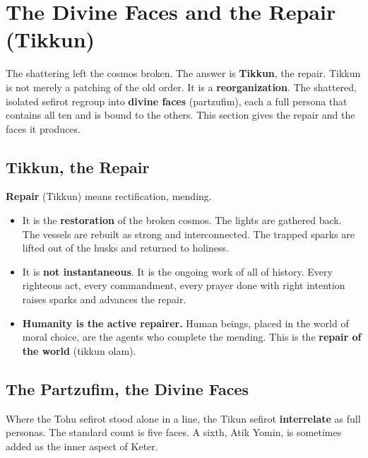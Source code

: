 \section{The Divine Faces and the Repair (Tikkun)}

The shattering left the cosmos broken. The answer is \textbf{Tikkun}, the repair. Tikkun is not merely a
patching of the old order. It is a \textbf{reorganization}. The shattered, isolated sefirot regroup into
\textbf{divine faces} (partzufim), each a full persona that contains all ten and is bound to the others.
This section gives the repair and the faces it produces.

\subsection{Tikkun, the Repair}

\textbf{Repair} (Tikkun) means rectification, mending.

\begin{itemize}
 \item It is the \textbf{restoration} of the broken cosmos. The lights are gathered back. The vessels
 are rebuilt as strong and interconnected. The trapped sparks are lifted out of the husks and
 returned to holiness.
 \item It is \textbf{not instantaneous}. It is the ongoing work of all of history. Every righteous act,
 every commandment, every prayer done with right intention raises sparks and advances the repair.
 \item \textbf{Humanity is the active repairer.} Human beings, placed in the world of moral choice, are
 the agents who complete the mending. This is the \textbf{repair of the world} (tikkun olam).
\end{itemize}

\subsection{The Partzufim, the Divine Faces}

Where the Tohu sefirot stood alone in a line, the Tikun sefirot \textbf{interrelate} as full personas.
The standard count is five faces. A sixth, Atik Yomin, is sometimes added as the inner aspect of Keter.

